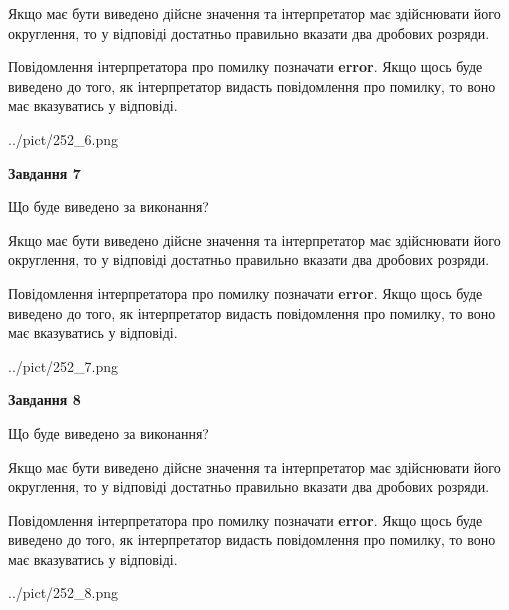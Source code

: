 \documentclass[12pt, ukrainian]{article}
\begin{document}
{\begin {Large}
Якщо має бути виведено дійсне значення та інтерпретатор має здійснювати його округлення, 
то у відповіді достатньо правильно вказати два дробових розряди.

Повідомлення інтерпретатора про помилку позначати \textbf{error}.
Якщо щось буде виведено до того, як інтерпретатор видасть повідомлення про помилку, 
то воно має вказуватись у відповіді. \par

\begin{center}
	{../pict/252_6.png}
\end{center}
\newpage

{\begin {center}\textbf{Завдання 7}\end {center}}\par
Що буде виведено за виконання? \par

Якщо має бути виведено дійсне значення та інтерпретатор має здійснювати його округлення, 
то у відповіді достатньо правильно вказати два дробових розряди.

Повідомлення інтерпретатора про помилку позначати \textbf{error}.
Якщо щось буде виведено до того, як інтерпретатор видасть повідомлення про помилку, 
то воно має вказуватись у відповіді. \par

\begin{center}
	{../pict/252_7.png}
\end{center}
\newpage

{\begin {center}\textbf{Завдання 8}\end {center}}\par
Що буде виведено за виконання? \par

Якщо має бути виведено дійсне значення та інтерпретатор має здійснювати його округлення, 
то у відповіді достатньо правильно вказати два дробових розряди.

Повідомлення інтерпретатора про помилку позначати \textbf{error}.
Якщо щось буде виведено до того, як інтерпретатор видасть повідомлення про помилку, 
то воно має вказуватись у відповіді. \par

\begin{center}
	{../pict/252_8.png}
\end{center}
\newpage


\end{Large}}
\end{document}
